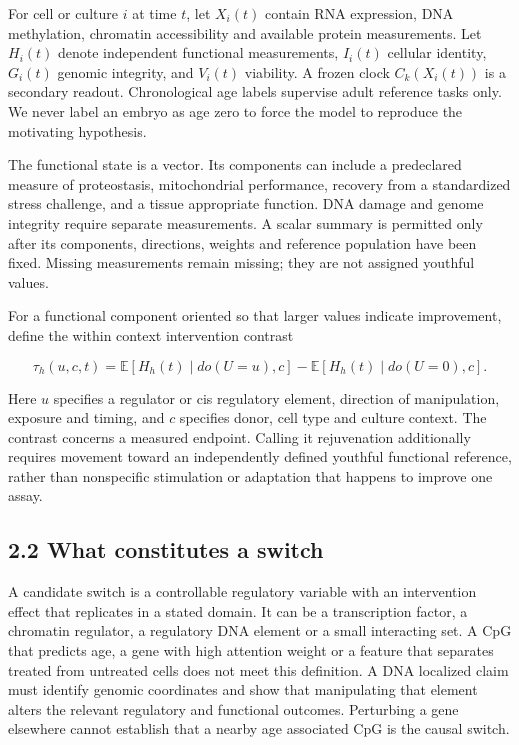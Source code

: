 \documentclass[
  11pt,
  letterpaper,
]{article}
\begin{document}
For cell or culture \(i\) at time \(t\), let \(X_i(t)\) contain RNA
expression, DNA methylation, chromatin accessibility and available
protein measurements. Let \(H_i(t)\) denote independent functional
measurements, \(I_i(t)\) cellular identity, \(G_i(t)\) genomic
integrity, and \(V_i(t)\) viability. A frozen clock \(C_k(X_i(t))\) is a
secondary readout. Chronological age labels supervise adult reference
tasks only. We never label an embryo as age zero to force the model to
reproduce the motivating hypothesis.

The functional state is a vector. Its components can include a
predeclared measure of proteostasis, mitochondrial performance, recovery
from a standardized stress challenge, and a tissue appropriate function.
DNA damage and genome integrity require separate measurements. A scalar
summary is permitted only after its components, directions, weights and
reference population have been fixed. Missing measurements remain
missing; they are not assigned youthful values.

For a functional component oriented so that larger values indicate
improvement, define the within context intervention contrast

\[
\tau_h(u,c,t)=\mathbb{E}[H_h(t)\mid do(U=u),c]
-\mathbb{E}[H_h(t)\mid do(U=0),c].
\]

Here \(u\) specifies a regulator or cis regulatory element, direction of
manipulation, exposure and timing, and \(c\) specifies donor, cell type
and culture context. The contrast concerns a measured endpoint. Calling
it rejuvenation additionally requires movement toward an independently
defined youthful functional reference, rather than nonspecific
stimulation or adaptation that happens to improve one assay.

\hypertarget{what-constitutes-a-switch}{%
\subsection{2.2 What constitutes a
switch}\label{what-constitutes-a-switch}}

A candidate switch is a controllable regulatory variable with an
intervention effect that replicates in a stated domain. It can be a
transcription factor, a chromatin regulator, a regulatory DNA element or
a small interacting set. A CpG that predicts age, a gene with high
attention weight or a feature that separates treated from untreated
cells does not meet this definition. A DNA localized claim must identify
genomic coordinates and show that manipulating that element alters the
relevant regulatory and functional outcomes. Perturbing a gene elsewhere
cannot establish that a nearby age associated CpG is the causal switch.
\end{document}
